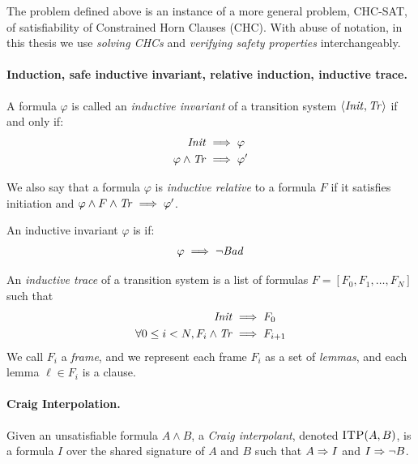 The \safety problem defined above is an instance of a more general problem,
CHC-SAT, of satisfiability of Constrained Horn Clauses (CHC). With abuse of
notation, in this thesis we use \textit{solving CHCs} and \textit{verifying
  safety properties} interchangeably.

\paragraph{Induction, safe inductive invariant, relative induction, inductive trace.}
A formula $\varphi$ is called an \emph{inductive invariant} of a transition
system $\langle \mathit{Init}, \mathit{Tr}\rangle$ if and only if:
\begin{align}
  \mathit{Init} &\implies \varphi\\
  \varphi \land \mathit{Tr} &\implies \varphi'
\end{align}

We also say that a formula $\varphi$ is \emph{inductive relative} to a formula
$F$ if it satisfies initiation and $\varphi \land F \land \mathit{Tr} \implies \varphi'$.

An inductive invariant $\varphi$ is \safe if:
\begin{align}
  \varphi \implies \lnot \mathit{Bad}
\end{align}

An \emph{inductive trace} of a transition system is a list of formulas $F = [F_0, F_1, \dots, F_N]$ such
that
\begin{align}
  \mathit{Init} &\implies F_0 \\
  \forall 0 \leq i < N , F_i \land \mathit{Tr} &\implies F_{i+1}
\end{align}
We call $F_i$ a \emph{frame}, and we represent each frame $F_i$ as a set of \emph{lemmas}, and each lemma $\ell \in
F_i$ is a clause.

\paragraph{Craig Interpolation.} Given an unsatisfiable formula $A \land B$, a \emph{Craig
interpolant}, denoted $\textsc{ITP}(A,B)$, is a formula $I$ over the shared signature of
$A$ and $B$ such that $A \Rightarrow I$ and $I \Rightarrow \neg B$.


